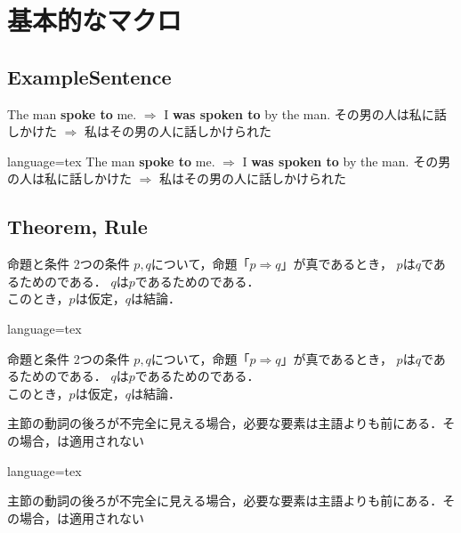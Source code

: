 \documentclass[../main]{subfiles}
\begin{document}
\setcounter{section}{1}
\section{基本的なマクロ}
\subsection{ExampleSentence}
\ExampleSentence
    {The man \textbf{spoke to} me. $\Rightarrow$ I \textbf{was spoken to} by the man.}
    {その男の人は私に話しかけた $\Rightarrow$ 私はその男の人に話しかけられた}
\begin{Code}{language=tex}
\ExampleSentence
    {The man \textbf{spoke to} me. $\Rightarrow$ I \textbf{was spoken to} by the man.}
    {その男の人は私に話しかけた $\Rightarrow$ 私はその男の人に話しかけられた}
\end{Code}

\subsection{Theorem, Rule}
\begin{Theorem}{命題と条件}
    2つの条件 $p,q$について，命題「$p \Rightarrow q$」が真であるとき，
    $p$は$q$であるためのである．
    $q$は$p$であるためのである． \\
    このとき，$p$は仮定，$q$は結論．
\end{Theorem}
\begin{Code}{language=tex}
\begin{Theorem}{命題と条件}
    2つの条件 $p,q$について，命題「$p \Rightarrow q$」が真であるとき，
    $p$は$q$であるためのである．
    $q$は$p$であるためのである． \\
    このとき，$p$は仮定，$q$は結論．
\end{Theorem}
\end{Code}

\begin{Rule}
    主節の動詞の後ろが不完全に見える場合，必要な要素は主語よりも前にある．その場合，は適用されない
\end{Rule}
\begin{Code}{language=tex}
\begin{Rule}
    主節の動詞の後ろが不完全に見える場合，必要な要素は主語よりも前にある．その場合，は適用されない
\end{Rule}
\end{Code}
\end{document}
